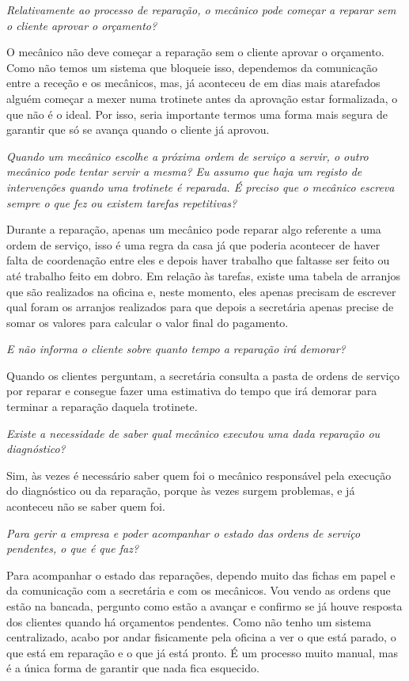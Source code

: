 \documentclass[11pt,a4paper]{article}
\newcommand{\pergunta}[1]{\item[P:] \textit{#1}}
\newcommand{\resposta}[1]{\item[R:] #1}
\begin{document}
\begin{transcription}
		\pergunta{Relativamente ao processo de reparação, o mecânico pode começar a reparar sem o cliente aprovar o orçamento? }
		\resposta{O mecânico não deve começar a reparação sem o cliente aprovar o orçamento. Como não temos um sistema que bloqueie isso, dependemos da comunicação entre a receção e os mecânicos, mas, já aconteceu de em dias mais atarefados  alguém começar a mexer numa trotinete antes da aprovação estar formalizada, o que não é o ideal. Por isso, seria importante termos uma forma mais segura de garantir que só se avança quando o cliente já aprovou.}
		
		\pergunta{Quando um mecânico escolhe a próxima ordem de serviço a servir, o outro mecânico pode tentar servir a mesma? Eu assumo que haja um registo de intervenções quando uma trotinete é reparada. É preciso que o mecânico escreva sempre o que fez ou existem tarefas repetitivas? }
		\resposta{Durante a reparação, apenas um mecânico pode reparar algo referente a uma ordem de serviço, isso é uma regra da casa já que poderia acontecer de haver falta de coordenação entre eles e depois haver trabalho que faltasse ser feito ou até trabalho feito em dobro. Em relação às tarefas, existe uma tabela de arranjos que são realizados na oficina e, neste momento, eles apenas precisam de escrever qual foram os arranjos realizados para que depois a secretária apenas precise de somar os valores para calcular o valor final do pagamento.}
		
		\pergunta{E não informa o cliente sobre quanto tempo a reparação irá demorar?}
		\resposta{Quando os clientes perguntam, a secretária consulta a pasta de ordens de serviço por reparar e consegue fazer uma estimativa do tempo que irá demorar para terminar a reparação daquela trotinete.}
		
		\pergunta{Existe a necessidade de saber qual mecânico executou uma dada reparação ou diagnóstico?}
		\resposta{Sim, às vezes é necessário saber quem foi o mecânico responsável pela execução do diagnóstico ou da reparação, porque às vezes surgem problemas, e já aconteceu não se saber quem foi.}
		
		\pergunta{Para gerir a empresa e poder acompanhar o estado das ordens de serviço pendentes, o que é que faz?}
		\resposta{Para acompanhar o estado das reparações, dependo muito das fichas em papel e da comunicação com a secretária e com os mecânicos. Vou vendo as ordens que estão na bancada, pergunto como estão a avançar e confirmo se já houve resposta dos clientes quando há orçamentos pendentes. Como não tenho um sistema centralizado, acabo por andar fisicamente pela oficina a ver o que está parado, o que está em reparação e o que já está pronto. É um processo muito manual, mas é a única forma de garantir que nada fica esquecido.}
		

\end{transcription}
\end{document}

